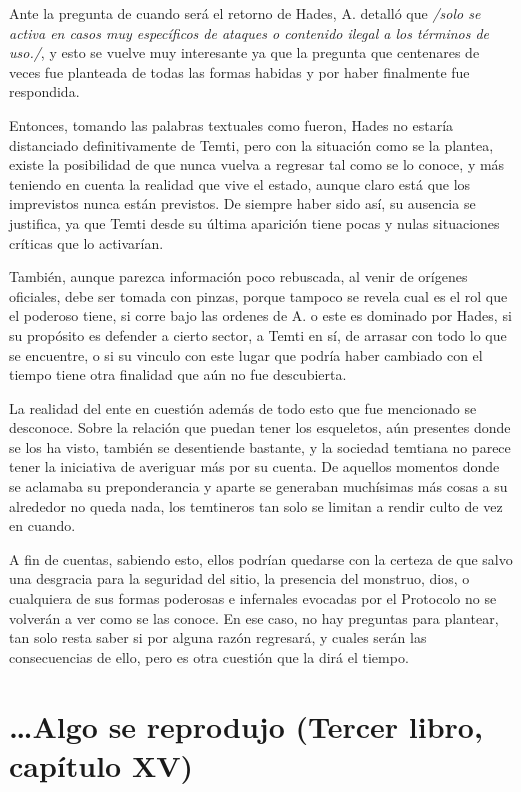 \documentclass[
]{book}
\begin{document}
Ante la pregunta de cuando será el retorno de Hades, A. detalló que \emph{/solo se activa en casos muy específicos de ataques o contenido ilegal a los términos de uso./}, y esto se vuelve muy interesante ya que la pregunta que centenares de veces fue planteada de todas las formas habidas y por haber finalmente fue respondida.

Entonces, tomando las palabras textuales como fueron, Hades no estaría distanciado definitivamente de Temti, pero con la situación como se la plantea, existe la posibilidad de que nunca vuelva a regresar tal como se lo conoce, y más teniendo en cuenta la realidad que vive el estado, aunque claro está que los imprevistos nunca están previstos. De siempre haber sido así, su ausencia se justifica, ya que Temti desde su última aparición tiene pocas y nulas situaciones críticas que lo activarían.

También, aunque parezca información poco rebuscada, al venir de orígenes oficiales, debe ser tomada con pinzas, porque tampoco se revela cual es el rol que el poderoso tiene, si corre bajo las ordenes de A. o este es dominado por Hades, si su propósito es defender a cierto sector, a Temti en sí, de arrasar con todo lo que se encuentre, o si su vinculo con este lugar que podría haber cambiado con el tiempo tiene otra finalidad que aún no fue descubierta.

La realidad del ente en cuestión además de todo esto que fue mencionado se desconoce. Sobre la relación que puedan tener los esqueletos, aún presentes donde se los ha visto, también se desentiende bastante, y la sociedad temtiana no parece tener la iniciativa de averiguar más por su cuenta. De aquellos momentos donde se aclamaba su preponderancia y aparte se generaban muchísimas más cosas a su alrededor no queda nada, los temtineros tan solo se limitan a rendir culto de vez en cuando.

A fin de cuentas, sabiendo esto, ellos podrían quedarse con la certeza de que salvo una desgracia para la seguridad del sitio, la presencia del monstruo, dios, o cualquiera de sus formas poderosas e infernales evocadas por el Protocolo no se volverán a ver como se las conoce. En ese caso, no hay preguntas para plantear, tan solo resta saber si por alguna razón regresará, y cuales serán las consecuencias de ello, pero es otra cuestión que la dirá el tiempo.

\hypertarget{algo-se-reprodujo-tercer-libro-capuxedtulo-xv}{%
\section{\ldots Algo se reprodujo (Tercer libro, capítulo XV)}\label{algo-se-reprodujo-tercer-libro-capuxedtulo-xv}}
\end{document}
